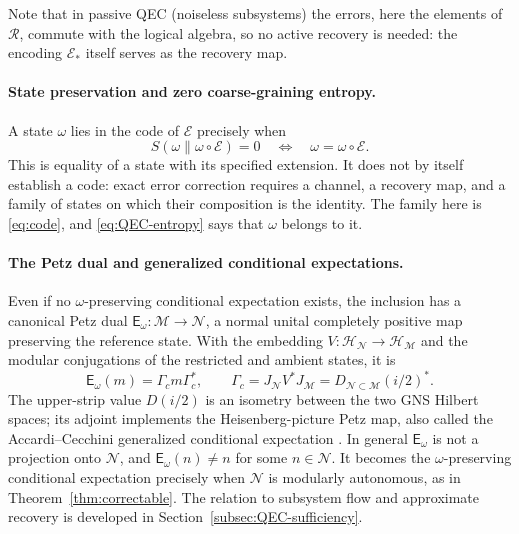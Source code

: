 \documentclass[a4paper,11pt]{article}
\theoremstyle{definition}
\newcommand{\mR}{\mathcal{R}}
\newcommand{\mN}{\mathcal{N}}
\newcommand{\mH}{\mathcal{H}}
\newcommand{\mM}{\mathcal{M}}
\newcommand{\mE}{\mathcal{E}}
\begin{document}
Note that in passive QEC (noiseless subsystems) the errors, here the elements of $\mR$, commute with the logical algebra, so no active recovery is needed: the encoding $\mE_*$ itself serves as the recovery map.

\paragraph{State preservation and zero coarse-graining entropy.}
A state $\omega$ lies in the code of $\mE$ precisely when
\begin{equation}
 S(\omega\|\omega\circ\mE)=0\quad\Longleftrightarrow\quad\omega=\omega\circ\mE .
 \label{eq:QEC-entropy}
\end{equation}
This is equality of a state with its specified extension. It does not by itself establish a code: exact error correction requires a channel, a recovery map, and a family of states on which their composition is the identity. The family here is \eqref{eq:code}, and \eqref{eq:QEC-entropy} says that $\omega$ belongs to it.


\paragraph{The Petz dual and generalized conditional expectations.}
Even if no $\omega$-preserving conditional expectation exists, the inclusion
has a canonical Petz dual $\mathsf E_\omega:\mM\to\mN$, a normal unital
completely positive map preserving the reference state. With the
embedding $V:\mH_{\mN}\to\mH_{\mM}$ and the modular conjugations of the
restricted and ambient states, it is
\begin{equation}
 \boxed{\quad
 \mathsf E_\omega(m)=\Gamma_c m\Gamma_c^*,\qquad
 \Gamma_c=J_{\mN}V^*J_{\mM}
 =D_{\mN\subset\mM}(i/2)^*.\quad}
 \label{eq:QEC-Petz-dual}
\end{equation}
The upper-strip value $D(i/2)$ is an isometry between the two GNS
Hilbert spaces; its adjoint implements the Heisenberg-picture Petz map,
also called the Accardi--Cecchini generalized conditional expectation
\cite{AccardiCecchini1982,Petz1988}. In general $\mathsf E_\omega$ is
not a projection onto $\mN$, and $\mathsf E_\omega(n)\ne n$ for some
$n\in\mN$. It becomes the $\omega$-preserving conditional expectation
precisely when $\mN$ is modularly autonomous, as in
Theorem~\ref{thm:correctable}. The relation to subsystem flow and
approximate recovery is developed in Section~\ref{subsec:QEC-sufficiency}.
\end{document}
